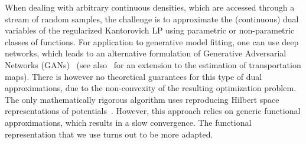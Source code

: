 When dealing with arbitrary continuous densities, which are accessed through a
stream of random samples, the challenge is to approximate  the (continuous) dual
variables of the regularized Kantorovich LP using parametric or non-parametric classes of functions. For application to
generative model fitting, one can use deep networks, which leads to an alternative
formulation of Generative Adversarial Networks (GANs)~\cite{arjovsky2017wgan}
(see also~\citet{seguy2018large} for an extension to the estimation of
transportation maps). There is however no theoretical guarantees for this type
of dual approximations, due to the non-convexity of the resulting optimization
problem. The only mathematically rigorous algorithm uses
reproducing Hilbert space representations of
potentials~\cite{2016-genevay-nips}. However, this approach relies on generic functional
approximations, which results in a slow convergence. The functional representation that we use turns out to be more adapted.